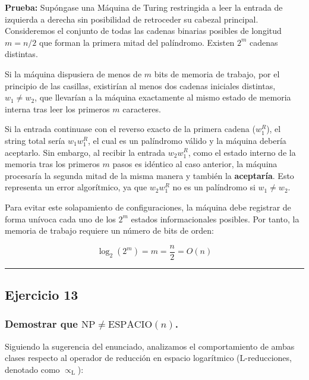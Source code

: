 \documentclass[12pt]{book} %
\begin{document}
\textbf{Prueba:} Supóngase una Máquina de Turing restringida a leer la
entrada de izquierda a derecha sin posibilidad de retroceder su cabezal
principal. Consideremos el conjunto de todas las cadenas binarias
posibles de longitud \(m = n/2\) que forman la primera mitad del
palíndromo. Existen \(2^m\) cadenas distintas.

Si la máquina dispusiera de menos de \(m\) bits de memoria de trabajo,
por el principio de las casillas, existirían al menos dos cadenas
iniciales distintas, \(w_1 \neq w_2\), que llevarían a la máquina
exactamente al mismo estado de memoria interna tras leer los primeros
\(m\) caracteres.

Si la entrada continuase con el reverso exacto de la primera cadena
(\(w_1^R\)), el string total sería \(w_1 w_1^R\), el cual es un
palíndromo válido y la máquina debería aceptarlo. Sin embargo, al
recibir la entrada \(w_2 w_1^R\), como el estado interno de la memoria
tras los primeros \(m\) pasos es idéntico al caso anterior, la máquina
procesaría la segunda mitad de la misma manera y también la
\textbf{aceptaría}. Esto representa un error algorítmico, ya que
\(w_2 w_1^R\) no es un palíndromo si \(w_1 \neq w_2\).

Para evitar este solapamiento de configuraciones, la máquina debe
registrar de forma unívoca cada uno de los \(2^m\) estados
informacionales posibles. Por tanto, la memoria de trabajo requiere un
número de bits de orden:

\[\log_2(2^m) = m = \frac{n}{2} = O(n)\]

\begin{center}\rule{0.5\linewidth}{0.5pt}\end{center}

\hypertarget{ejercicio-13}{%
\subsection{Ejercicio 13}\label{ejercicio-13}}

\hypertarget{demostrar-que-textnp-neq-textespacion.}{%
\subsubsection{\texorpdfstring{Demostrar que
\(\text{NP} \neq \text{ESPACIO}(n)\).}{Demostrar que \textbackslash text\{NP\} \textbackslash neq \textbackslash text\{ESPACIO\}(n).}}\label{demostrar-que-textnp-neq-textespacion.}}

Siguiendo la sugerencia del enunciado, analizamos el comportamiento de
ambas clases respecto al operador de reducción en espacio logarítmico
(\(\text{L}\)-reducciones, denotado como \(\propto_{\text{L}}\)):
\end{document}
